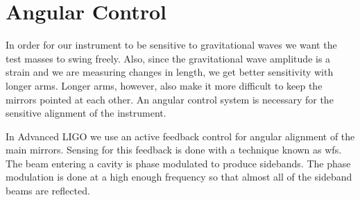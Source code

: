 

\section{Angular Control}

In order for our instrument to be sensitive to gravitational waves we want
the test masses to swing freely.
Also, since the gravitational wave amplitude is a strain and we are measuring
changes in length, we get better sensitivity with longer arms.
Longer arms, however, also make it more difficult to keep the mirrors pointed
at each other.
An angular control system is necessary for the sensitive alignment of the
instrument.

In Advanced LIGO we use an active feedback control for angular alignment of
the main mirrors\cite{aligowfs}.
Sensing for this feedback is done with a technique known as \ac{wfs}.
The beam entering a cavity is phase modulated to produce sidebands.
The phase modulation is done at a high enough frequency so that almost all
of the sideband beams are reflected.

